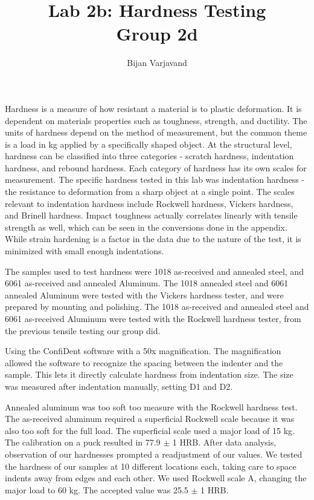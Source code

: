\documentclass{article}
\author{Bijan Varjavand}
\title{Lab 2b: Hardness Testing\\Group 2d}
\begin{document}
\maketitle

\clearpage

Hardness is a measure of how resistant a material is to plastic deformation. It is dependent on materials properties such as toughness, strength, and ductility. The units of hardness depend on the method of measurement, but the common theme is a load in kg applied by a specifically shaped object. At the structural level, hardness can be classified into three categories - scratch hardness, indentation hardness, and rebound hardness. Each category of hardness has its own scales for measurement. The specific hardness tested in this lab was indentation hardness - the resistance to deformation from a sharp object at a single point. The scales relevant to indentation hardness include Rockwell hardness, Vickers hardness, and Brinell hardness. Impact toughness actually correlates linearly with tensile strength as well, which can be seen in the conversions done in the appendix. While strain hardening is a factor in the data due to the nature of the test, it is minimized with small enough indentations.

The samples used to test hardness were 1018 as-received and annealed steel, and 6061 as-received and annealed Aluminum. The 1018 annealed steel and 6061 annealed Aluminum were tested with the Vickers hardness tester, and were prepared by mounting and polishing. The 1018 as-received and annealed steel and 6061 as-received Aluminum were tested with the Rockwell hardness tester, from the previous tensile testing our group did.

Using the ConfiDent software with a 50x magnification. The magnification allowed the software to recognize the spacing between the indenter and the sample. This lets it directly calculate hardness from indentation size. The size was measured after indentation manually, setting D1 and D2.

Annealed aluminum was too soft too measure with the Rockwell hardness test. The as-received aluminum required a superficial Rockwell scale because it was also too soft for the full load. The superficial scale used a major load of 15 kg. The calibration on a puck resulted in 77.9 $\pm$ 1 HRB. After data analysis, observation of our hardnesses prompted a readjustment of our values. We tested the hardness of our samples at 10 different locations each, taking care to space indents away from edges and each other. We used Rockwell scale A, changing the major load to 60 kg. The accepted value was 25.5 $\pm$ 1 HRB.
\end{document}
